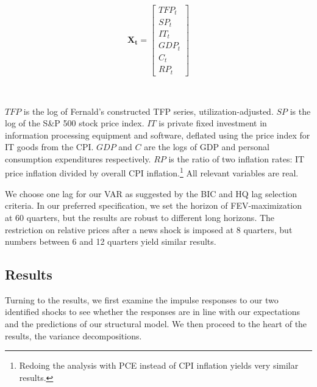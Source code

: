 \documentclass[11pt]{article}
\renewcommand{\[}{\begin{equation}}
\renewcommand{\]}{\end{equation}}
\begin{document}
	\begin{equation*}
	\mathbf{X_t} = 
	\begin{bmatrix}
    TFP_t      \\
 
   SP_t   \\
   
   IT_t \\
   
   GDP_t \\
   
   C_t \\
   
   RP_t
\end{bmatrix}
	\end{equation*}
	
	\
	
	
$TFP$ is the log of Fernald's constructed TFP series, utilization-adjusted. $SP$ is the log of the S\&P 500 stock price index. $IT$ is private fixed investment in information processing equipment and software, deflated using the price index for IT goods from the CPI. $GDP$ and $C$ are the logs of GDP and personal consumption expenditures respectively. $RP$ is the ratio of two inflation rates: IT price inflation divided by overall CPI inflation.\footnote{Redoing the analysis with PCE instead of CPI inflation yields very similar results.} All relevant variables are real. 

We choose one lag for our VAR as suggested by the BIC and HQ lag selection criteria. In our preferred specification, we set the horizon of FEV-maximization at 60 quarters, but the results are robust to different long horizons. The restriction on relative prices after a news shock is imposed at 8 quarters, but numbers between 6 and 12 quarters yield similar results.


\subsection{Results}

Turning to the results, we first examine the impulse responses to our two identified shocks to see whether the responses are in line with our expectations and the predictions of our structural model. We then proceed to the heart of the results, the variance decompositions.
\end{document}
